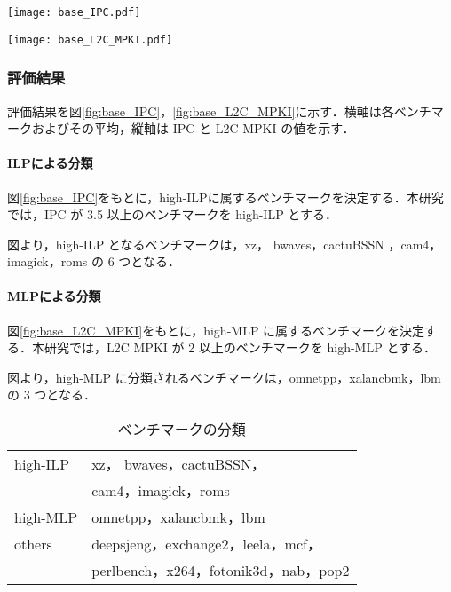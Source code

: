 \documentclass[twocolumn]{jsarticle}
\begin{document}
  \begin{figure*}[ht]
    \centering
    \texttt{[image: base\_IPC.pdf]}
    \caption{ベンチマークごとの IPC}  
    \label{fig:base_IPC}
  \end{figure*}

  \begin{figure*}[ht]
    \centering
    \texttt{[image: base\_L2C\_MPKI.pdf]}
    \caption{ベンチマークごとの L2C MPKI}  
    \label{fig:base_L2C_MPKI}
  \end{figure*}


  \subsubsection{評価結果}
  評価結果を図\ref{fig:base_IPC}，\ref{fig:base_L2C_MPKI}に示す．横軸は各ベンチマークおよびその平均，縦軸は IPC と L2C MPKI の値を示す．

  \paragraph{ILPによる分類}
  図\ref{fig:base_IPC}をもとに，high-ILPに属するベンチマークを決定する．本研究では，IPC が 3.5 以上のベンチマークを high-ILP とする．

  図より，high-ILP となるベンチマークは，xz， bwaves，cactuBSSN ，cam4，imagick，roms の 6 つとなる．

  \paragraph{MLPによる分類}
  図\ref{fig:base_L2C_MPKI}をもとに，high-MLP に属するベンチマークを決定する．本研究では，L2C MPKI が 2 以上のベンチマークを high-MLP とする．

  図より，high-MLP に分類されるベンチマークは，omnetpp，xalancbmk，lbm の 3 つとなる．

  \begin{table}[htb]
    \caption{ベンチマークの分類}
    \footnotesize
    \center
      \begin{tabular}{l|l} \hline \hline
       high-ILP & xz， bwaves，cactuBSSN，\\
       & cam4，imagick，roms\\ \hline
       high-MLP & omnetpp，xalancbmk，lbm\\ \hline
       others & deepsjeng，exchange2，leela，mcf，\\
       & perlbench，x264，fotonik3d，nab，pop2 \\ \hline	
    \end{tabular}
    \label{tab:bench_class}
  \end{table}
\end{document}
